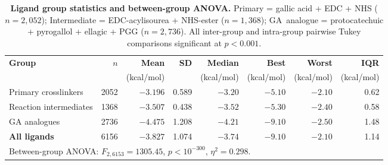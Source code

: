 \documentclass[11pt]{article}
\begin{document}
\begin{table}[H]
\small
\centering
\caption{\textbf{Ligand group statistics and between-group ANOVA.}
  Primary = gallic acid + EDC + NHS ($n = 2{,}052$);
  Intermediate = EDC-acylisourea + NHS-ester ($n = 1{,}368$);
  GA~analogue = protocatechuic + pyrogallol + ellagic + PGG ($n = 2{,}736$).
  All inter-group and intra-group pairwise Tukey comparisons significant
  at $p < 0.001$.}
\label{tab:si_group_stats}
\begin{tabular}{lrrrrrrr}
\toprule
\textbf{Group} & \textbf{$n$} & \textbf{Mean} & \textbf{SD}
  & \textbf{Median} & \textbf{Best} & \textbf{Worst}
  & \textbf{IQR} \\
 & & (kcal/mol) & & (kcal/mol) & (kcal/mol) & (kcal/mol) & (kcal/mol) \\
\midrule
Primary crosslinkers & 2052 & $-3.196$ & 0.589 & $-3.20$ & $-5.10$ & $-2.10$ & 0.62 \\
Reaction intermediates & 1368 & $-3.507$ & 0.438 & $-3.52$ & $-5.30$ & $-2.40$ & 0.58 \\
GA analogues           & 2736 & $-4.475$ & 1.208 & $-4.21$ & $-9.10$ & $-2.50$ & 1.48 \\
\midrule
\textbf{All ligands}   & 6156 & $-3.827$ & 1.074 & $-3.74$ & $-9.10$ & $-2.10$ & 1.14 \\
\midrule
\multicolumn{8}{l}{\small Between-group ANOVA: $F_{2,6153} = 1305.45$, $p < 10^{-300}$, $\eta^2 = 0.298$.} \\
\bottomrule
\end{tabular}
\end{table}
\end{document}
